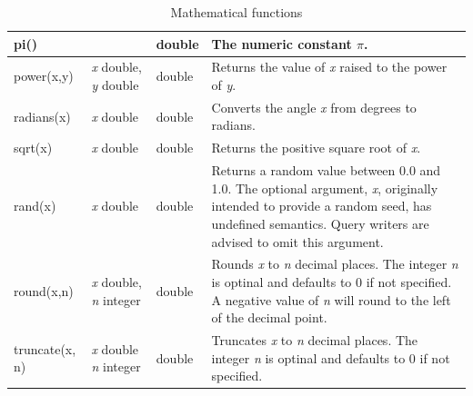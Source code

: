 \documentclass[11pt,a4paper]{ivoa}
\begin{document}
\begin{table}[th]
\begin{tabular}{|p{}|p{}|p{}|p{}|}
        \hline
        pi() &
        &
        double &
        The numeric constant \(\pi\).
        \tabularnewline
        
        \hline
        power(x,y) &
        \textit{x} double,
        \newline
        \textit{y} double &
        double &
        Returns the value of \textit{x} raised to the power of \textit{y}.
        \tabularnewline

        \hline
        radians(x) &
        \textit{x} double &
        double &
        Converts the angle \textit{x} from degrees to radians.
        \tabularnewline

        \hline
        sqrt(x) &
        \textit{x} double &
        double &
        Returns the positive square root of \textit{x}.
        \tabularnewline

        \hline
        rand(x) &
        \textit{x} double &
        double &
        Returns a random value between 0.0 and 1.0.
        The optional argument, \textit{x}, originally intended to provide a random seed,
        has undefined semantics. Query writers are advised to omit this argument.
        \tabularnewline

        \hline
        round(x,n) &
        \textit{x} double,
        \newline
        \textit{n} integer &
        double &
        Rounds \textit{x} to \textit{n} decimal places.
        The integer \textit{n} is optinal and defaults to 0 if not specified. 
        A negative value of \textit{n} will round to the left of the decimal point.
        \tabularnewline

        \hline
        truncate(x, n) &
        \textit{x} double
        \newline
        \textit{n} integer &
        double &
        Truncates \textit{x} to \textit{n} decimal places.
        The integer \textit{n} is optinal and defaults to 0 if not specified. 
        \tabularnewline

        \hline
    \end{tabular}
    \caption{Mathematical functions}
    \label{table:math.functions}
\end{table}
\end{document}
